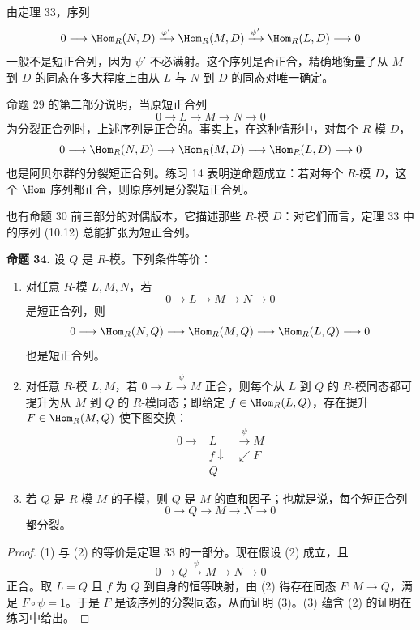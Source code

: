由定理 33，序列
\[
0\longrightarrow\Hom_R(N,D)\xrightarrow{\varphi'}\Hom_R(M,D)\xrightarrow{\psi'}\Hom_R(L,D)\longrightarrow0
\]
一般不是短正合列，因为 $\psi'$ 不必满射。这个序列是否正合，精确地衡量了从 $M$ 到 $D$ 的同态在多大程度上由从 $L$ 与 $N$ 到 $D$ 的同态对唯一确定。

命题 29 的第二部分说明，当原短正合列
\[
0\longrightarrow L\longrightarrow M\longrightarrow N\longrightarrow0
\]
为分裂正合列时，上述序列是正合的。事实上，在这种情形中，对每个 $R$-模 $D$，
\[
0\longrightarrow\Hom_R(N,D)\longrightarrow\Hom_R(M,D)\longrightarrow\Hom_R(L,D)\longrightarrow0
\]
也是阿贝尔群的分裂短正合列。练习 14 表明逆命题成立：若对每个 $R$-模 $D$，这个 $\Hom$ 序列都正合，则原序列是分裂短正合列。

也有命题 30 前三部分的对偶版本，它描述那些 $R$-模 $D$：对它们而言，定理 33 中的序列 (10.12) 总能扩张为短正合列。

\noindent\textbf{命题 34.} 设 $Q$ 是 $R$-模。下列条件等价：
\begin{enumerate}[label=(\arabic*)]
\item 对任意 $R$-模 $L,M,N$，若
\[
0\longrightarrow L\longrightarrow M\longrightarrow N\longrightarrow0
\]
是短正合列，则
\[
0\longrightarrow\Hom_R(N,Q)\longrightarrow\Hom_R(M,Q)\longrightarrow\Hom_R(L,Q)\longrightarrow0
\]
也是短正合列。
\item 对任意 $R$-模 $L,M$，若 $0\to L\xrightarrow{\psi}M$ 正合，则每个从 $L$ 到 $Q$ 的 $R$-模同态都可提升为从 $M$ 到 $Q$ 的 $R$-模同态；即给定 $f\in\Hom_R(L,Q)$，存在提升 $F\in\Hom_R(M,Q)$ 使下图交换：
\[
\begin{array}{ccc}
0\longrightarrow&L&\xrightarrow{\psi}M\\
&f\downarrow&\swarrow F\\[-1mm]
&Q&
\end{array}
\]
\item 若 $Q$ 是 $R$-模 $M$ 的子模，则 $Q$ 是 $M$ 的直和因子；也就是说，每个短正合列
\[
0\longrightarrow Q\longrightarrow M\longrightarrow N\longrightarrow0
\]
都分裂。
\end{enumerate}

\begin{proof}
(1) 与 (2) 的等价是定理 33 的一部分。现在假设 (2) 成立，且
\[
0\longrightarrow Q\xrightarrow{\psi}M\longrightarrow N\longrightarrow0
\]
正合。取 $L=Q$ 且 $f$ 为 $Q$ 到自身的恒等映射，由 (2) 得存在同态 $F:M\to Q$，满足 $F\circ\psi=1$。于是 $F$ 是该序列的分裂同态，从而证明 (3)。(3) 蕴含 (2) 的证明在练习中给出。
\end{proof}

